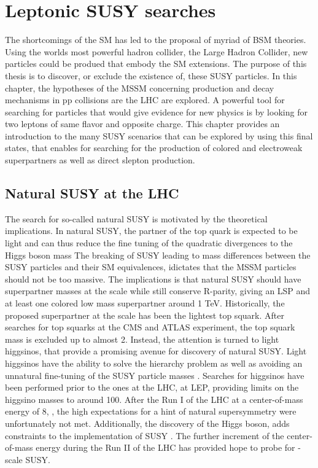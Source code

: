 \chapter{Leptonic SUSY searches} \label{search}
\noindent\justify
The shortcomings of the SM has led to the proposal of myriad of BSM theories. 
Using the worlds most powerful hadron collider, the Large Hadron Collider, new particles could be produed that embody the SM extensions. 
The purpose of this thesis is to discover, or exclude the existence of, these SUSY particles. 
\newpara
\noindent\justify
In this chapter, the hypotheses of the MSSM concerning production and decay mechanisms in pp collisions are the LHC are explored. 
A powerful tool for searching for particles that would give evidence for new physics is by looking for two leptons of same flavor and opposite charge. 
This chapter provides an introduction to the many SUSY scenarios that can be explored by using this final states, that enables for searching for the production of colored and electroweak superpartners as well as direct slepton production. 
\newpage
\section{Natural SUSY at the LHC}
\noindent\justify
The search for so-called natural SUSY is motivated by the theoretical implications\cite{Dimopoulos:1995mi,Barbieri:2009ev,Papucci:2011wy}.  
In natural SUSY, the partner of the top quark is expected to be light and can thus reduce the fine tuning of the quadratic divergences to the Higgs boson mass
The breaking of SUSY leading to mass differences between the SUSY particles and their SM equivalences, idictates that the MSSM particles should not be too massive. 
The implications is that natural SUSY should have superpartner masses at the \TeV scale while still conserve R-parity, giving an LSP and at least one colored low mass superpartner around 1 TeV. 
Historically, the proposed superpartner at the \TeV scale has been the lightest top squark. 
After searches for top squarks at the CMS and ATLAS experiment, the top squark mass is excluded up to almost 2\TeV. 
Instead, the attention is turned to light higgsinos, that provide a promising avenue for discovery of natural SUSY. 
Light higgsinos have the ability to solve the hierarchy problem as well as avoiding an unnatural fine-tuning of the SUSY particle masses \cite{Han:2014kaa,Giudice:2010wb}. 
Searches for higgsinos have been performed prior to the ones at the LHC, at LEP, providing limits on the higgsino masses to around 100\GeV. 
After the Run I of the LHC at a center-of-mass energy of 8\TeV, \cite{Kraml:2012er,Autermann:2016les}, the high expectations for a hint of natural supersymmetry were unfortunately not met. 
Additionally, the discovery of the Higgs boson, adds constraints to the implementation of SUSY \cite{Arbey:2011ab}. 
The further increment of the center-of-mass energy during the Run II of the LHC has provided hope to probe for \TeV-scale SUSY.

